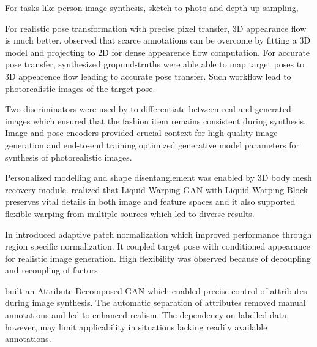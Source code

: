         For tasks like person image synthesis, sketch-to-photo and depth up sampling,  

        For realistic pose transformation with precise pixel transfer, 3D appearance flow is much better.  {
            observed that scarce annotations can be overcome by fitting a 3D model and projecting to 2D for dense appearence flow computation. For accurate pose transfer, synthesized gropund-truths were able able to map target poses to 3D appearence flow leading to accurate pose transfer. Such workflow lead to photorealistic images of the target pose.
        }
		
		Two discriminators were used by \cite{DBLP:journals/corr/abs-1906-07251} to differentiate between real and generated images which ensured that the fashion item remains consistent during synthesis. Image and pose encoders provided crucial context for high-quality image generation and end-to-end training optimized generative model parameters for synthesis of photorealistic images.

        Personalized modelling and shape disentanglement was enabled by 3D body mesh recovery module. \cite{DBLP:conf/iccv/LiuPML0G19} realized that Liquid Warping GAN with Liquid Warping Block preserves vital details in both image and feature spaces and it also supported flexible warping from multiple sources which led to diverse results.

        In \citeyear{DBLP:conf/ijcai/HuangXCWZWHD20} \cite{DBLP:conf/ijcai/HuangXCWZWHD20} introduced adaptive patch normalization which improved performance through region specific normalization. It coupled target pose with conditioned appearance for realistic image generation. High flexibility was observed because of decoupling and recoupling of factors. 
        
        \cite{DBLP:conf/cvpr/MenMJML20} built an Attribute-Decomposed GAN which enabled precise control of attributes during image synthesis. The automatic separation of attributes removed manual annotations and led to enhanced realism. The dependency on labelled data, however, may limit applicability in situations lacking readily available annotations.

